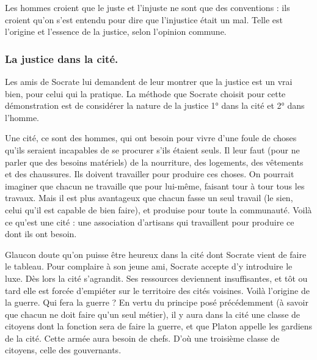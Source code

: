 \documentclass[fontsize=28pt,a4paper]{scrartcl}
\begin{document}

Les hommes croient que le juste et l'injuste ne sont que des conventions : ils croient qu'on s'est entendu pour dire que l'injustice était un mal. Telle est l'origine et l'essence de la justice, selon l'opinion commune.

\subsubsection*{La justice dans la cité.}

Les amis de Socrate lui demandent de leur montrer que la justice est un vrai bien, pour celui qui la pratique. La méthode que Socrate choisit pour cette démonstration est de considérer la nature de la justice 1° dans la cité et 2° dans l'homme.

Une cité, ce sont des hommes, qui ont besoin pour vivre d'une foule de choses qu'ils seraient incapables de se procurer s'ils étaient seuls. Il leur faut (pour ne parler que des besoins matériels) de la nourriture, des logements, des vêtements et des chaussures. Ils doivent travailler pour produire ces choses. On pourrait imaginer que chacun ne travaille que pour lui-même, faisant tour à tour tous les travaux. Mais il est plus avantageux que chacun fasse un seul travail (le sien, celui qu'il est capable de bien faire), et produise pour toute la communauté. Voilà ce qu'est une cité : une association d'artisans qui travaillent pour produire ce dont ils ont besoin.

Glaucon doute qu'on puisse être heureux dans la cité dont Socrate vient de faire le tableau. Pour complaire à son jeune ami, Socrate accepte d'y introduire le luxe. Dès lors la cité s'agrandit. Ses ressources deviennent insuffisantes, et tôt ou tard elle est forcée d'empiéter sur le territoire des cités voisines. Voilà l'origine de la guerre. Qui fera la guerre ? En vertu du principe posé précédemment (à savoir que chacun ne doit faire qu'un seul métier), il y aura dans la cité une classe de citoyens dont la fonction sera de faire la guerre, et que Platon appelle les gardiens de la cité. Cette armée aura besoin de chefs. D'où une troisième classe de citoyens, celle des gouvernants.
\end{document}
